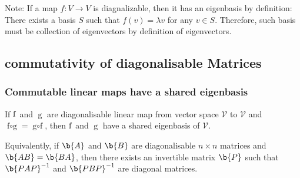 Note: If a map $f: V \to V$ is diagnalizable, then it has an eigenbasis by definition:
There exists a basis $S$ such that $f(v) = \lambda v$ for any $v \in S$. Therefore, such basis must be collection of eigenvectors by definition of eigenvectors.








\subsection{commutativity  of diagonalisable Matrices}

\subsubsection{Commutable linear maps have a shared eigenbasis}

\begin{theorem} If $\operatorname{f}$ and $\operatorname{g}$ are diagonalisable linear map from vector space $\mathcal{V}$ to $\mathcal{V}$  and $\operatorname{f\circ g} = \operatorname{g \circ f}$, then $\operatorname{f}$ and $\operatorname{g}$ have a shared eigenbasis of $\mathcal{V}$.

Equivalently, if $\b{A}$ and $\b{B}$ are diagonalisable $n \times n$ matrices and $\b{AB} = \b{BA}$, then there exists an invertible matrix $\b{P}$ such that $\b{PAP}^{-1}$ and $\b{PBP}^{-1}$ are diagonal matrices.
\end{theorem}

